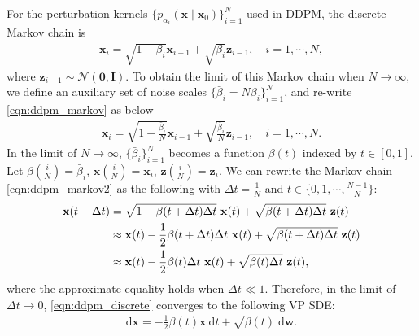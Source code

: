 \documentclass{article} %
\newcommand{\ud}{\mathrm{d}}
\newcommand{\mcal}{\mathcal}
\newcommand{\bfx}{\mathbf{x}}
\newcommand{\bfw}{\mathbf{w}}
\newcommand{\bfz}{\mathbf{z}}
\newcommand{\bfI}{\mathbf{I}}
\newcommand{\bfzero}{\mathbf{0}}
\newcommand{\bbeta}{\bar{\beta}}
\begin{document}
For the perturbation kernels $\{p_{\alpha_i}(\bfx \mid \bfx_0)\}_{i=1}^N$ used in DDPM, the discrete Markov chain is
\begin{align}
    \bfx_i = \sqrt{1-\beta_{i}} \bfx_{i-1} + \sqrt{\beta_{i}} \bfz_{i-1}, \quad i=1,\cdots,N, \label{eqn:ddpm_markov}
\end{align}
where $\bfz_{i-1} \sim \mcal{N}(\bfzero, \bfI)$. To obtain the limit of this Markov chain when $N\to\infty$, we define an auxiliary set of noise scales $\{\bbeta_i = N \beta_i\}_{i=1}^N$, and re-write \cref{eqn:ddpm_markov} as below
\begin{align}
    \bfx_i = \sqrt{1-\frac{\bbeta_{i}}{N}} \bfx_{i-1} + \sqrt{\frac{\bbeta_{i}}{N}} \bfz_{i-1}, \quad i=1,\cdots,N. \label{eqn:ddpm_markov2}
\end{align}
In the limit of $N\to \infty$, $\{\bbeta_i\}_{i=1}^N$ becomes a function $\beta(t)$ indexed by $t \in [0, 1]$. Let $\beta\left(\frac{i}{N}\right) = \bbeta_i$, $\bfx(\frac{i}{N}) = \bfx_i$, $\bfz(\frac{i}{N}) = \bfz_i$. We can rewrite the Markov chain \cref{eqn:ddpm_markov2} as the following with $\Delta t = \frac{1}{N}$ and $t \in \{0, 1, \cdots, \frac{N-1}{N}\}$:
\begin{align}
\bfx(t + \Delta t) &= \sqrt{1 - \beta(t + \Delta t)\Delta t} ~\bfx(t) + \sqrt{\beta(t + \Delta t)\Delta t}~ \bfz(t) \notag\\
&\approx \bfx(t) -\frac{1}{2}\beta(t + \Delta t)\Delta t~\bfx(t) + \sqrt{\beta(t+\Delta t)\Delta t}~\bfz(t) \notag\\
&\approx \bfx(t) -\frac{1}{2}\beta(t)\Delta t~\bfx(t) + \sqrt{\beta(t)\Delta t}~ \bfz(t), \label{eqn:ddpm_discrete}
\end{align}
where the approximate equality holds when $\Delta t \ll 1$.
Therefore, in the limit of $\Delta t \to 0$, \cref{eqn:ddpm_discrete} converges to the following VP SDE:
\begin{align}
\ud \bfx = -\frac{1}{2}\beta(t) \bfx~ \ud t + \sqrt{\beta(t)} ~\ud \bfw.
\end{align}
\end{document}
